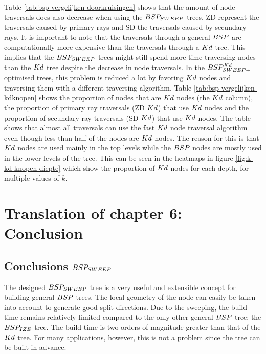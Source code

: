Table \ref{tab:bsp-vergelijken-doorkruisingen} shows that the amount of node traversals does also decrease when using the $BSP_{SWEEP}$ trees. ZD represent the traversals caused by primary rays and SD the traversals caused by secundary rays.
It is important to note that the traversals through a general $BSP$ are computationally more expensive than the traversals through a $Kd$ tree. This implies that the $BSP_{SWEEP}$ trees might still spend more time traversing nodes than the $Kd$ tree despite the decrease in node traversals.
In the $BSP^{Kd}_{SWEEP+}$ optimised trees, this problem is reduced a lot by favoring $Kd$ nodes and traversing them with a different traversing algorithm. Table \ref{tab:bsp-vergelijken-kdknopen} shows the proportion of nodes that are $Kd$ nodes (the $Kd$ column), the proportion of primary ray traversals (ZD $Kd$) that use $Kd$ nodes and the proportion of secundary ray traversals (SD $Kd$) that use $Kd$ nodes. The table shows that almost all traversals can use the fast $Kd$ node traversal algorithm even though less than half of the nodes are $Kd$ nodes. The reason for this is that $Kd$ nodes are used mainly in the top levels while the $BSP$ nodes are mostly used in the lower levels of the tree. This can be seen in the heatmaps in figure \ref{fig:k-kd-knopen-diepte} which show the proportion of $Kd$ nodes for each depth, for multiple values of $k$. 
\\

\newpage
\section{Translation of chapter 6: Conclusion}

\subsection{Conclusions $BSP_{SWEEP}$}
The designed $BSP_{SWEEP}$ tree is a very useful and extensible concept for building general $BSP$ trees.
The local geometry of the node can easily be taken into account to generate good split directions.
Due to the sweeping, the build time remains relatively limited compared to the only other general $BSP$ tree: the $BSP_{IZE}$ tree.
The build time is two orders of magnitude greater than that of the $Kd$ tree.
For many applications, however, this is not a problem since the tree can be built in advance.\\

